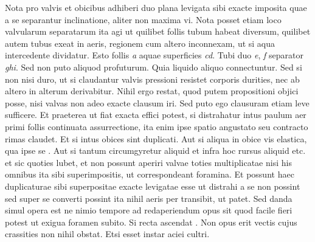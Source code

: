 \pstart Nota pro valvis\protect{} et obicibus adhiberi  duo plana levigata sibi exacte imposita quae a se separantur inclinatione, aliter non maxima vi. Nota posset etiam loco valvularum\protect{} separatarum ita agi ut quilibet follis tubum habeat diversum, quilibet autem tubus exeat in aeris, regionem cum altero inconnexam, ut si aqua intercedente dividatur. Esto follis \textit{a} aquae superficies \textit{cd}. Tubi duo \textit{e}, \textit{f} separator \textit{ghi}. Sed non puto aliquod profuturum. Quia liquido aliquo connectuntur. Sed si non nisi duro, ut si claudantur valvis\protect{} pressioni resistet corporis durities, nec ab altero in alterum derivabitur. Nihil ergo restat, quod putem propositioni objici posse, nisi valvas\protect{} non adeo exacte clausum iri. Sed puto ego clausuram etiam leve sufficere. Et praeterea ut fiat exacta effici potest, si distrahatur intus paulum aer primi follis continuata assurrectione, ita enim ipse spatio angustato seu contracto rimas claudet. Et si intus obices sint duplicati. Aut si aliqua in obice vis elastica\protect{}, qua ipse se . Aut si tantum circumgyretur aliquid et infra hoc rursus aliquid etc. et sic quoties lubet, et non possunt aperiri valvae\protect{} toties multiplicatae nisi his omnibus ita sibi superimpositis, ut correspondeant foramina. Et possunt haec duplicaturae sibi superpositae exacte levigatae esse ut distrahi a se non possint sed super se converti possint ita nihil aeris per transibit, ut patet. Sed danda simul opera est ne nimio tempore ad redaperiendum opus sit quod facile fieri potest ut exigua   foramen subito. Si recta ascendat . Non opus erit vectis\protect{} cujus crassities non nihil obstat. Etsi esset instar aciei cultri. \pend 